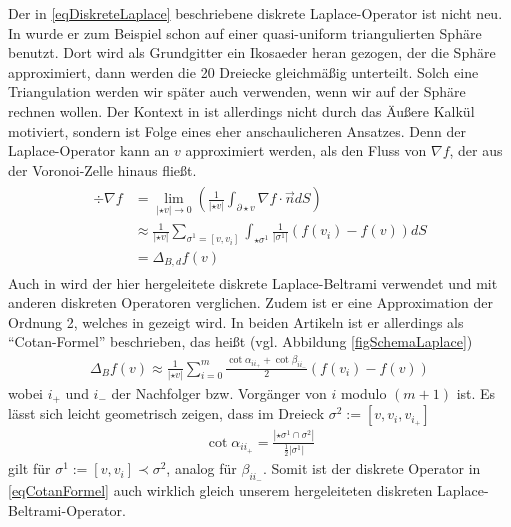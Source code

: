     \begin{bemerkung}
      Der in \eqref{eqDiskreteLaplace} beschriebene diskrete Laplace-Operator ist nicht neu.
      In \cite{arakawa} wurde er zum Beispiel schon auf einer quasi-uniform 
      triangulierten Sphäre benutzt. 
      Dort wird als Grundgitter ein Ikosaeder heran gezogen, der die Sphäre approximiert,
      dann werden die 20 Dreiecke gleichmäßig unterteilt.
      Solch eine Triangulation werden wir später auch verwenden, wenn wir auf der Sphäre rechnen wollen.
      Der Kontext in \cite{arakawa} ist allerdings nicht durch das Äußere Kalkül motiviert, sondern ist Folge eines eher anschaulicheren Ansatzes.
      Denn der Laplace-Operator kann an \( v \) approximiert werden, als den Fluss von \( \nabla f \), 
      der aus der Voronoi-Zelle hinaus fließt.
      \begin{align}
      \begin{aligned}
        \div\nabla f&= \lim_{\left| \star v \right| \rightarrow 0}
                                 \left( \frac{1}{\left| \star v \right|} \int_{\partial\star v}
                                              \nabla f \cdot \vec{n} dS\right) \\
                     &\approx \frac{1}{\left| \star v \right|} \sum_{\sigma^{1}=\left[ v,v_{i} \right]}
                                  \int_{\star\sigma^{1}} \frac{1}{\left| \sigma^{1} \right|} \left( f(v_{i}) - f(v) \right) dS \\
                     &= \Delta_{B,d} f(v)             
      \end{aligned}
      \end{align}
      Auch in \cite{meyer} wird der hier hergeleitete diskrete Laplace-Beltrami verwendet und mit anderen diskreten Operatoren verglichen.
      Zudem ist er eine Approximation der Ordnung 2, welches in \cite{xu} gezeigt wird.
      In beiden Artikeln ist er allerdings als "`Cotan-Formel"' beschrieben, das heißt (vgl. Abbildung \ref{figSchemaLaplace})
      \begin{align}
        \label{eqCotanFormel}
        \Delta_{B} f(v) \approx \frac{1}{\left| \star v \right|} \sum_{i=0}^{m} 
                      \frac{\cot\alpha_{ii_{+}} + \cot\beta_{ii_{-}}}{2}
                            \left( f(v_{i}) - f(v) \right)
      \end{align}
      wobei \( i_{+} \) und \( i_{-} \) der Nachfolger bzw. Vorgänger von \( i \) modulo \( (m+1) \) ist.
      Es lässt sich leicht geometrisch zeigen, dass im Dreieck \( \sigma^{2}:=\left[ v, v_{i}, v_{i_{+}} \right] \) 
      \begin{align}
        \cot\alpha_{ii_{+}} = \frac{\left| \star\sigma^{1} \cap \sigma^{2} \right|}{\frac{1}{2}\left| \sigma^{1} \right|}
      \end{align}
      gilt für \( \sigma^{1}:=\left[ v, v_{i} \right] \prec \sigma^{2}\),
      analog für \( \beta_{ii_{-}} \).
      Somit ist der diskrete Operator in \eqref{eqCotanFormel} auch wirklich gleich unserem hergeleiteten diskreten Laplace-Beltrami-Operator.


\end{bemerkung}

